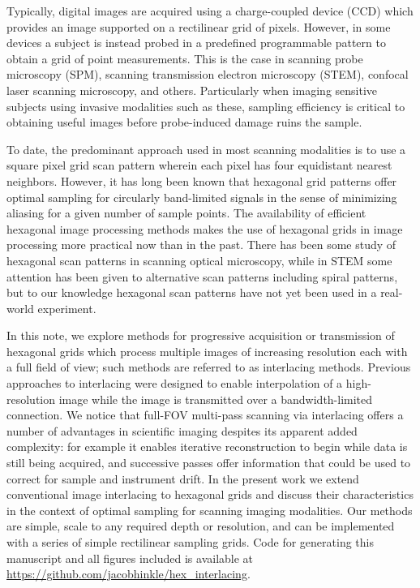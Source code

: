 \documentclass[aip, amsmath, amssymb, nobibnotes, nofootinbib, citeautoscript, reprint, superscriptaddress]{revtex4-1}
\begin{document}
    Typically, digital images are acquired using a charge-coupled device (CCD) which provides an image supported on a rectilinear grid of pixels.
    However, in some devices a subject is instead probed in a predefined programmable pattern to obtain a grid of point measurements.
    This is the case in scanning probe microscopy (SPM), scanning transmission electron microscopy (STEM), confocal laser scanning microscopy, and others.
    Particularly when imaging sensitive subjects using invasive modalities such as
    these, sampling efficiency is critical to obtaining useful images before probe-induced damage ruins the sample.


    To date, the predominant approach used in most scanning modalities is to use a square pixel grid scan pattern wherein each pixel has four equidistant nearest neighbors.
    However, it has long been known that hexagonal grid patterns offer optimal sampling for circularly band-limited signals in the sense of minimizing aliasing for a given number of sample points\cite{petersen1962}.
    The availability of efficient hexagonal image processing methods makes the use
    of hexagonal grids in image processing more practical now than in the past\cite{birdsong2016hexfft,middleton2006hexagonal}.
    There has been some study of hexagonal scan patterns in scanning optical
    microscopy\cite{heintzmann2007}, while in STEM some attention has been given to alternative scan patterns including spiral patterns\cite{sang2016dynamic}, but to our knowledge hexagonal scan patterns have not yet been used in a real-world experiment.


    In this note, we explore methods for progressive acquisition or transmission of hexagonal grids which process multiple images of increasing resolution each with a full field of view; such methods are referred to as interlacing methods.
    Previous approaches to interlacing were designed to enable interpolation of a
    high-resolution image while the image is transmitted over a bandwidth-limited connection.
    We notice that full-FOV multi-pass scanning via interlacing offers a number of
    advantages in scientific imaging despites its apparent added complexity: for
    example it enables iterative reconstruction to begin while data is still being
    acquired, and successive passes offer information that could be used to correct
    for sample and instrument drift.
    In the present work we extend conventional image interlacing to hexagonal grids and discuss their characteristics in the context of optimal sampling for scanning imaging modalities.
    Our methods are simple, scale to any required depth or resolution, and can be
    implemented with a series of simple rectilinear sampling grids.
    Code for generating this manuscript and all figures included is available at
    \url{https://github.com/jacobhinkle/hex_interlacing}.
\end{document}
